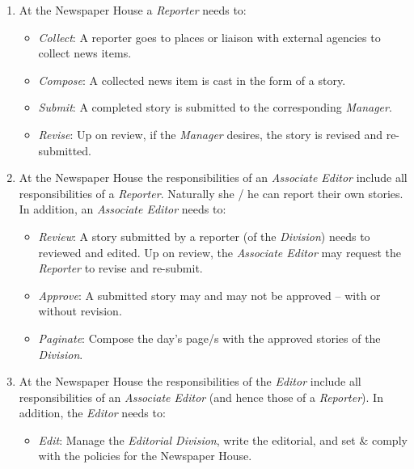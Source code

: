 \documentclass{article}
\begin{document}
\begin{enumerate}
\begin{enumerate}
\item At the \textsf{Newspaper House} a {\em Reporter} needs to:

\begin{itemize}
\item {\em Collect}: A reporter goes to places or liaison with external agencies to collect news items.
\item {\em Compose}: A collected news item is cast in the form of a story.
\item {\em Submit}: A completed story is submitted to the corresponding {\em Manager}. 
\item {\em Revise}: Up on review, if the {\em Manager} desires, the story is revised and re-submitted.
\end{itemize}

\item At the \textsf{Newspaper House} the responsibilities of an {\em Associate Editor} include all responsibilities of a {\em Reporter}. Naturally she / he can report their own stories. In addition, an {\em Associate Editor} needs to:

\begin{itemize}
\item {\em Review}: A story submitted by a reporter (of the {\em Division}) needs to reviewed and edited. Up on review, the {\em Associate Editor} may request the {\em Reporter} to revise and re-submit.
\item {\em Approve}: A submitted story may and may not be approved -- with or without revision.
\item {\em Paginate}: Compose the day's page/s with the approved stories of the {\em Division}.
\end{itemize}

\item At the \textsf{Newspaper House} the responsibilities of the {\em Editor} include all responsibilities of an {\em Associate Editor} (and hence those of a {\em Reporter}). In addition, the {\em Editor} needs to:

\begin{itemize}
\item {\em Edit}: Manage the {\em Editorial Division}, write the editorial, and set \& comply with the policies for the \textsf{Newspaper House}.
\end{itemize}


\end{enumerate}
\end{enumerate}
\end{document}
